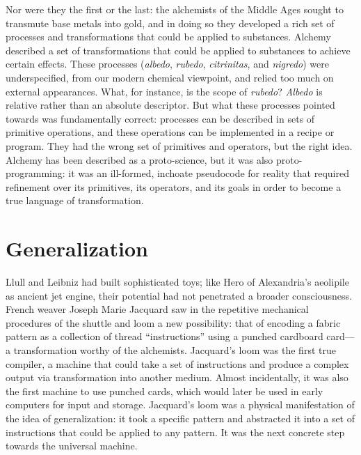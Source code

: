 Nor were they the first or the last:  the alchemists of the Middle Ages sought to transmute base metals into gold, and in doing so they developed a rich set of processes and transformations that could be applied to substances.  Alchemy described a set of transformations that could be applied to substances to achieve certain effects.  These processes (\emph{albedo}, \emph{rubedo}, \emph{citrinitas}, and \emph{nigredo}) were underspecified, from our modern chemical viewpoint, and relied too much on external appearances.  What, for instance, is the scope of \emph{rubedo}?  \emph{Albedo} is relative rather than an absolute descriptor.  But what these processes pointed towards was fundamentally correct:  processes can be described in sets of primitive operations, and these operations can be implemented in a recipe or program.  They had the wrong set of primitives and operators, but the right idea.  Alchemy has been described as a proto-science, but it was also proto-programming:  it was an ill-formed, inchoate pseudocode for reality that required refinement over its primitives, its operators, and its goals in order to become a true language of transformation.


\section{Generalization}

Llull and Leibniz had built sophisticated toys; like Hero of Alexandria's aeolipile as ancient jet engine, their potential had not penetrated a broader consciousness.  French weaver Joseph Marie Jacquard saw in the repetitive mechanical procedures of the shuttle and loom a new possibility:  that of encoding a fabric pattern as a collection of thread ``instructions'' using a punched cardboard card---a transformation worthy of the alchemists.  Jacquard's loom was the first true compiler, a machine that could take a set of instructions and produce a complex output via transformation into another medium.  Almost incidentally, it was also the first machine to use punched cards, which would later be used in early computers for input and storage.  Jacquard's loom was a physical manifestation of the idea of generalization:  it took a specific pattern and abstracted it into a set of instructions that could be applied to any pattern.  It was the next concrete step towards the universal machine.

